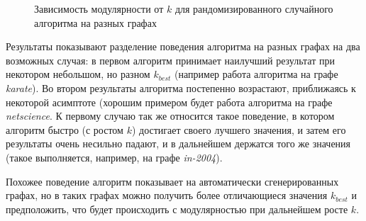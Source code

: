 \begin{figure}[H]
\begin{tikzpicture}
	\end{tikzpicture}
	\columnwidth
	\caption{Зависимость модулярности от $k$ для рандомизированного случайного алгоритма на разных графах}
\end{figure}

Результаты показывают разделение поведения алгоритма на разных графах на два возможных случая: в первом алгоритм принимает наилучший результат при некотором небольшом, но разном $k_{best}$ (например работа алгоритма на графе \emph{karate}). Во втором результаты алгоритма постепенно возрастают, приближаясь к некоторой асимптоте (хорошим примером будет работа алгоритма на графе \emph{netscience}. К первому случаю так же относится такое поведение, в котором алгоритм быстро (с ростом $k$) достигает своего лучшего значения, и затем его результаты очень несильно падают, и в дальнейшем держатся того же значения (такое выполняется, например, на графе \emph{in-2004}).

Похожее поведение алгоритм показывает на автоматически сгенерированных графах, но в таких графах можно получить более отличающиеся значения $k_{best}$ и предположить, что будет происходить с модулярностью при дальнейшем росте $k$.

